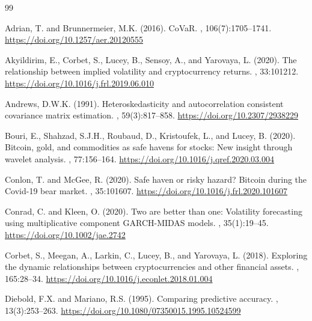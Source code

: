 \documentclass[11pt,a4paper]{article}
\begin{document}
\begin{thebibliography}{99}

Adrian, T. and Brunnermeier, M.K. (2016).
\newblock CoVaR.
, 106(7):1705--1741.
\newblock \url{https://doi.org/10.1257/aer.20120555}

Akyildirim, E., Corbet, S., Lucey, B., Sensoy, A., and Yarovaya, L. (2020).
\newblock The relationship between implied volatility and cryptocurrency returns.
, 33:101212.
\newblock \url{https://doi.org/10.1016/j.frl.2019.06.010}

Andrews, D.W.K. (1991).
\newblock Heteroskedasticity and autocorrelation consistent covariance matrix estimation.
, 59(3):817--858.
\newblock \url{https://doi.org/10.2307/2938229}

Bouri, E., Shahzad, S.J.H., Roubaud, D., Kristoufek, L., and Lucey, B. (2020).
\newblock Bitcoin, gold, and commodities as safe havens for stocks: New insight through wavelet analysis.
, 77:156--164.
\newblock \url{https://doi.org/10.1016/j.qref.2020.03.004}

Conlon, T. and McGee, R. (2020).
\newblock Safe haven or risky hazard? Bitcoin during the Covid-19 bear market.
, 35:101607.
\newblock \url{https://doi.org/10.1016/j.frl.2020.101607}

Conrad, C. and Kleen, O. (2020).
\newblock Two are better than one: Volatility forecasting using multiplicative component GARCH-MIDAS models.
, 35(1):19--45.
\newblock \url{https://doi.org/10.1002/jae.2742}

Corbet, S., Meegan, A., Larkin, C., Lucey, B., and Yarovaya, L. (2018).
\newblock Exploring the dynamic relationships between cryptocurrencies and other financial assets.
, 165:28--34.
\newblock \url{https://doi.org/10.1016/j.econlet.2018.01.004}

Diebold, F.X. and Mariano, R.S. (1995).
\newblock Comparing predictive accuracy.
, 13(3):253--263.
\newblock \url{https://doi.org/10.1080/07350015.1995.10524599}


\end{thebibliography}
\end{document}
